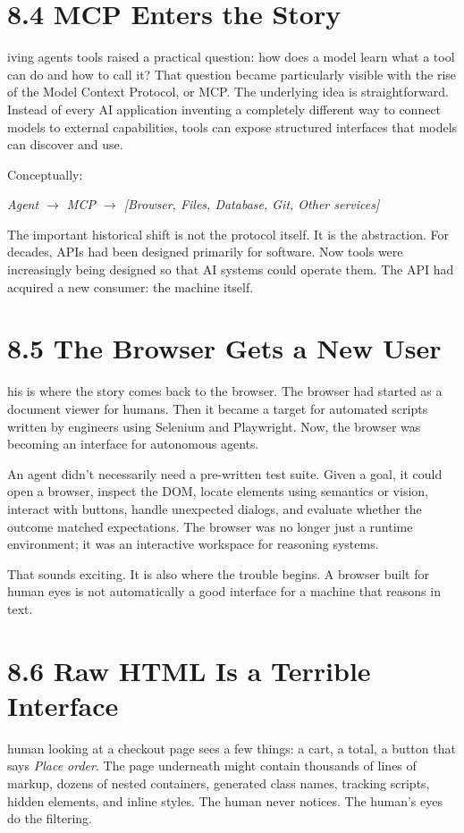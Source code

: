 \documentclass[11pt, a4paper, openany]{book}
\newcommand{\initialcap}[1]{{\fontfamily{lmss}\selectfont\huge\textbf{#1}}}
\begin{document}
\section{8.4 MCP Enters the Story}
\noindent \initialcap{G}iving agents tools raised a practical question: how does a model learn what a tool can do and how to call it? That question became particularly visible with the rise of the Model Context Protocol, or MCP. The underlying idea is straightforward. Instead of every AI application inventing a completely different way to connect models to external capabilities, tools can expose structured interfaces that models can discover and use.

Conceptually:
\begin{center}
\textit{Agent $\rightarrow$ MCP $\rightarrow$ [Browser, Files, Database, Git, Other services]}
\end{center}
The important historical shift is not the protocol itself. It is the abstraction. For decades, APIs had been designed primarily for software. Now tools were increasingly being designed so that AI systems could operate them. The API had acquired a new consumer: the machine itself.

\section{8.5 The Browser Gets a New User}
\noindent \initialcap{T}his is where the story comes back to the browser. The browser had started as a document viewer for humans. Then it became a target for automated scripts written by engineers using Selenium and Playwright. Now, the browser was becoming an interface for autonomous agents. 

An agent didn't necessarily need a pre-written test suite. Given a goal, it could open a browser, inspect the DOM, locate elements using semantics or vision, interact with buttons, handle unexpected dialogs, and evaluate whether the outcome matched expectations. The browser was no longer just a runtime environment; it was an interactive workspace for reasoning systems.

That sounds exciting. It is also where the trouble begins. A browser built for human eyes is not automatically a good interface for a machine that reasons in text.

\section{8.6 Raw HTML Is a Terrible Interface}
\noindent \initialcap{A} human looking at a checkout page sees a few things: a cart, a total, a button that says \textit{Place order}. The page underneath might contain thousands of lines of markup, dozens of nested containers, generated class names, tracking scripts, hidden elements, and inline styles. The human never notices. The human's eyes do the filtering.
\end{document}
